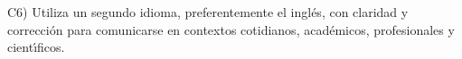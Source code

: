 C6) Utiliza un segundo idioma, preferentemente el ingl\'{e}s, con claridad
y correcci\'{o}n para comunicarse en contextos cotidianos, acad\'{e}micos,
profesionales y cient\'{\i}ficos.
